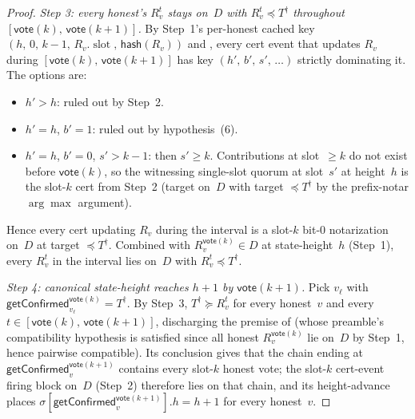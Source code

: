 \ifx\litemode\undefined\documentclass{article}\fi
\newcommand{\slot}[0]{\ensuremath{\operatorname{\mathrm{slot}}}}
\newcommand{\hash}{\mathsf{hash}}
\newcommand{\vote}{\mathsf{vote}}
\newcommand{\getConfirmed}{\textsf{getConfirmed}\xspace}
\theoremstyle{plain}
\theoremstyle{definition}
\theoremstyle{remark}
\begin{document}
\begin{proof}
\emph{Step 3: every honest's $R_v^t$ stays on~$D$ with $R_v^t \preceq T^\dagger$ throughout $[\vote(k),\, \vote(k+1)]$.}
By Step~1's per-honest cached key $(h,\, 0,\, k-1,\, R_v.\slot,\, \hash(R_v))$ and , every cert event that updates $R_v$ during $[\vote(k),\, \vote(k+1)]$ has key $(h',\, b',\, s',\, \ldots)$ strictly dominating it. The options are:
\begin{itemize}
  \item $h' > h$: ruled out by Step~2.
  \item $h' = h$, $b' = 1$: ruled out by hypothesis~(6).
  \item $h' = h$, $b' = 0$, $s' > k-1$: then $s' \geq k$. Contributions at slot~$\geq k$ do not exist before $\vote(k)$, so the witnessing single-slot quorum at slot~$s'$ at height~$h$ is the slot-$k$ cert from Step~2 (target on~$D$ with target $\preceq T^\dagger$ by the prefix-notar $\arg\max$ argument).
\end{itemize}
Hence every cert updating $R_v$ during the interval is a slot-$k$ bit-$0$ notarization on~$D$ at target $\preceq T^\dagger$. Combined with $R_v^{\vote(k)} \in D$ at state-height~$h$ (Step~1), every $R_v^t$ in the interval lies on~$D$ with $R_v^t \preceq T^\dagger$.

\emph{Step 4: canonical state-height reaches $h+1$ by $\vote(k+1)$.}
Pick $v_\ell$ with $\getConfirmed_{v_\ell}^{\vote(k)} = T^\dagger$. By Step~3, $T^\dagger \succeq R_v^t$ for every honest~$v$ and every $t \in [\vote(k),\, \vote(k+1)]$, discharging the premise of  (whose preamble's compatibility hypothesis is satisfied since all honest $R_v^{\vote(k)}$ lie on~$D$ by Step~1, hence pairwise compatible). Its conclusion gives that the chain ending at $\getConfirmed_v^{\vote(k+1)}$ contains every slot-$k$ honest vote; the slot-$k$ cert-event firing block on~$D$ (Step~2) therefore lies on that chain, and its height-advance places $\sigma[\getConfirmed_v^{\vote(k+1)}].h = h + 1$ for every honest~$v$.


\end{proof}
\end{document}
